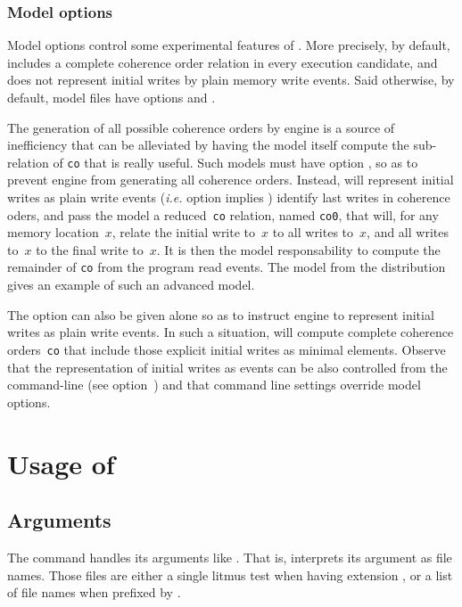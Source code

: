 \subsubsection*{Model options}

Model options control some experimental features of \herd.
More precisely, by default, \herd{} includes a complete
coherence order relation in every execution candidate,
and does not represent initial writes by plain memory
write events. Said otherwise, by default,
model files have options  and .

The generation of all possible coherence orders by \herd{} engine
is a source of inefficiency that can be alleviated by having the
model itself compute the sub-relation of \texttt{co} that is really useful.
Such models must have option , so as to
prevent \herd{} engine from generating all coherence orders.
Instead, \herd{} will represent initial writes as plain write events
(\emph{i.e.} option  implies )
identify last writes in coherence oders, and pass the model a
reduced~\texttt{co} relation, named \texttt{co0}, that will,
for any memory location~$x$,
relate the initial write to~$x$ to all writes to~$x$, and all writes
to~$x$ to the final write to~$x$.
It is then the model responsability  to compute the remainder
of \texttt{co} from the program read events.
The model  from the distribution
gives an example of such an advanced model.

The option  can also be given alone so as to instruct
\herd{} engine to represent initial writes as plain write events.
In such a situation, \herd{} will compute complete coherence
orders~\texttt{co} that include those explicit initial writes as
minimal elements.
Observe that the representation of initial writes as events
can be also controlled from the
command-line (see option~)
and that command line settings override model options.

\section{Usage of \herd}

\subsection{Arguments}
The command \herd{} handles its arguments like \litmus.
That is, \herd{} interprets its argument as file names.
Those files are either a single litmus test
when having extension , or a list of file names
when prefixed by .


